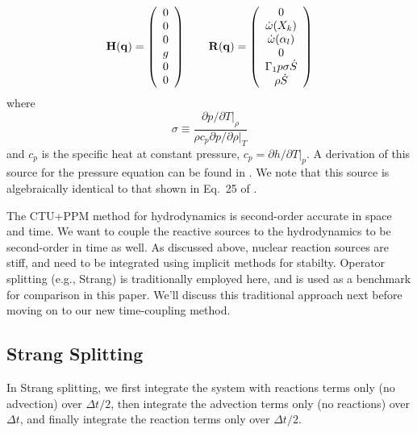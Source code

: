 \documentclass[times,modern]{aastex63}
\newcommand{\omegadot}{\dot{\omega}}
\newcommand{\Sdot}{\dot{S}}
\newcommand{\qb}{{\bf q}}
\newcommand{\Hb}{{\bf H}}
\newcommand{\Rb}{{\bf R}}
\begin{document}
\begin{equation}
\label{eq:prim_sources}
\Hb(\qb) = \left ( \begin{array}{c}
     0 \\
     0 \\
     0 \\
     g \\
     0 \\
     0 \\
   \end{array} \right )
\qquad
\Rb(\qb) = \left ( \begin{array}{c}
     0 \\
     \omegadot(X_k) \\
     \omegadot(\alpha_l) \\
     0 \\
     \Gamma_1 p \sigma \Sdot \\
     \rho \Sdot
   \end{array} \right )
\end{equation}
where
\begin{equation}
\sigma \equiv \frac{\partial p/\partial T |_\rho}{\rho c_p \partial p/\partial \rho |_T}
\end{equation}
and $c_p$ is the specific heat at constant pressure, $c_p = \partial
h/\partial T |_p$.  A derivation of this source for the pressure
equation can be found in \cite{ABNZ:III}.  We note that this source is
algebraically identical to that shown in Eq.~25 of \cite{castro}.

The CTU+PPM method for hydrodynamics is second-order accurate in space
and time.  We want to couple the reactive sources to the hydrodynamics
to be second-order in time as well.  As discussed above, nuclear
reaction sources are stiff, and need to be integrated using implicit
methods for stabilty.  Operator splitting (e.g., Strang) is
traditionally employed here, and is used as a benchmark for comparison
in this paper.  We'll discuss this traditional approach next before moving
on to our new time-coupling method.



\subsection{Strang Splitting}

In Strang splitting, we first integrate the system with reactions terms only (no advection)
over $\Delta t/2$, then integrate the advection terms only (no reactions) over $\Delta t$,
and finally integrate the reaction terms only over $\Delta t/2$.
\end{document}
